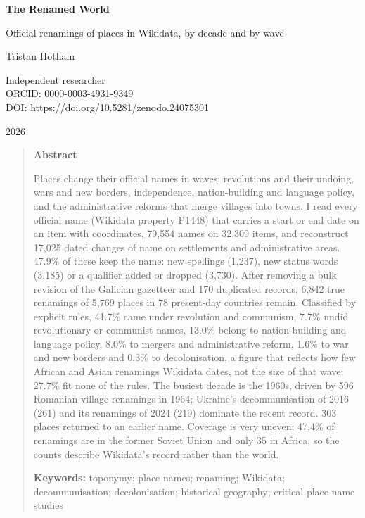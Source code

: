 \documentclass[11pt,a4paper]{article}
\begin{document}
\begin{center}
{\Large\bfseries The Renamed World\par}
\vspace{0.4em}
{\large Official renamings of places in Wikidata, by decade and by wave\par}
\vspace{1.2em}
{\large Tristan Hotham\par}
\vspace{0.3em}
{\small Independent researcher\\
ORCID: 0000-0003-4931-9349\\
DOI: https://doi.org/10.5281/zenodo.24075301\par}
\vspace{0.8em}
2026
\end{center}

\begin{quote}
\small
\begin{center}\textbf{Abstract}\end{center}
Places change their official names in waves: revolutions and their undoing, wars and new borders, independence, nation-building and language policy, and the administrative reforms that merge villages into towns. I read every official name (Wikidata property P1448) that carries a start or end date on an item with coordinates, 79,554 names on 32,309 items, and reconstruct 17,025 dated changes of name on settlements and administrative areas. 47.9\% of these keep the name: new spellings (1,237), new status words (3,185) or a qualifier added or dropped (3,730). After removing a bulk revision of the Galician gazetteer and 170 duplicated records, 6,842 true renamings of 5,769 places in 78 present-day countries remain. Classified by explicit rules, 41.7\% came under revolution and communism, 7.7\% undid revolutionary or communist names, 13.0\% belong to nation-building and language policy, 8.0\% to mergers and administrative reform, 1.6\% to war and new borders and 0.3\% to decolonisation, a figure that reflects how few African and Asian renamings Wikidata dates, not the size of that wave; 27.7\% fit none of the rules. The busiest decade is the 1960s, driven by 596 Romanian village renamings in 1964; Ukraine's decommunisation of 2016 (261) and its renamings of 2024 (219) dominate the recent record. 303 places returned to an earlier name. Coverage is very uneven: 47.4\% of renamings are in the former Soviet Union and only 35 in Africa, so the counts describe Wikidata's record rather than the world.

\textbf{Keywords:} toponymy; place names; renaming; Wikidata; decommunisation; decolonisation; historical geography; critical place-name studies
\end{quote}
\end{document}
